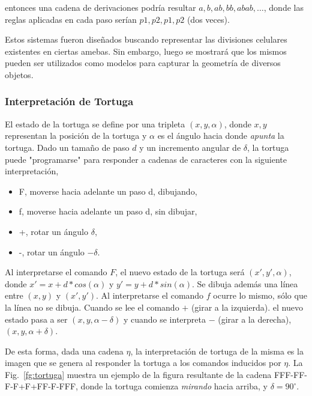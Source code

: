 entonces una cadena de derivaciones podría resultar $a, b, ab, bb, abab, \dots$, donde las reglas aplicadas en cada paso serían $p1, p2, p1, p2$ (dos veces).

Estos sistemas fueron diseñados buscando representar las divisiones celulares existentes en ciertas amebas.
Sin embargo, luego se mostrará que los mismos pueden ser utilizados como modelos para capturar la geometría de diversos objetos.

\subsubsection{Interpretación de Tortuga}
El estado de la tortuga se define por una tripleta $(x,y,\alpha)$, donde $x,y$ representan la posición de la tortuga y $\alpha$ es el ángulo hacia donde {\em apunta} la tortuga.
Dado un tamaño de paso $d$ y un incremento angular de $\delta$, la tortuga puede "programarse" para responder a cadenas de caracteres con la siguiente interpretación,

\begin{itemize}
\item F, moverse hacia adelante un paso d, dibujando,
\item f, moverse hacia adelante un paso d, sin dibujar,
\item +, rotar un ángulo $\delta$,
\item -, rotar un ángulo $-\delta$.
\end{itemize}

Al interpretarse el comando $F$, el nuevo estado de la tortuga será $(x',y',\alpha)$, donde $x' = x + d * cos(\alpha)$ y $y' = y + d * sin(\alpha)$. Se dibuja además una línea entre $(x,y)$ y $(x',y')$.
Al interpretarse el comando $f$ ocurre lo mismo, sólo que la línea no se dibuja.
Cuando se lee el comando $+$ (girar a la izquierda). el nuevo estado pasa a ser $(x,y,\alpha-\delta)$ y cuando se interpreta $-$ (girar a la derecha),  $(x,y,\alpha+\delta)$.

De esta forma, dada una cadena $\eta$, la interpretación de tortuga de la misma es la imagen que se genera al responder la tortuga a los comandos inducidos por $\eta$.
La Fig.~\ref{fg:tortuga} muestra un ejemplo de la figura resultante de la cadena FFF-FF-F-F+F+FF-F-FFF, donde la tortuga comienza {\em mirando} hacia arriba, y $\delta = 90^{\circ}$.

